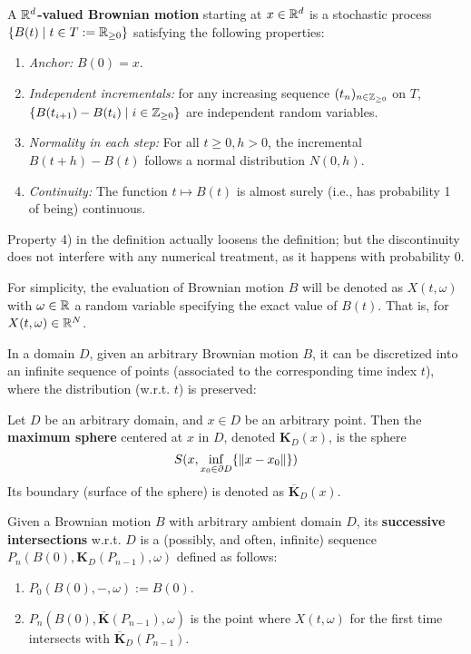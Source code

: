 \documentclass[10pt]{article}
\begin{document}
\begin{definition}
    A \textbf{$\mathbb{R}^d$-valued Brownian motion} starting at $x \in \mathbb{R}^d$ is a stochastic process $\{ B(t) \mid t \in T := \mathbb{R}_{\geq 0} \}$ satisfying the following properties:
    \begin{enumerate}[label=\arabic*)]
        \item \emph{Anchor:} $B(0) = x$.
        \item \emph{Independent incrementals:} for any increasing sequence $(t_n)_{n \in \mathbb{Z}_{\geq 0}}$ on $T$, $\{ B(t_{i+1}) - B(t_i) \mid i \in \mathbb{Z}_{\geq 0} \}$ are independent random variables.
        \item \emph{Normality in each step:} For all $t \geq 0, h > 0$, the incremental $B(t + h) - B(t)$ follows a normal distribution $N(0, h)$.
        \item \emph{Continuity:} The function $t \mapsto B(t)$ is almost surely (i.e., has probability 1 of being) continuous.
    \end{enumerate}
\end{definition}
\nogap
\begin{remark}
    Property 4) in the definition actually loosens the definition; but the discontinuity does not interfere with any numerical treatment, as it happens with probability 0.
\end{remark}
\nogap
\begin{notation}
For simplicity, the evaluation of Brownian motion $B$ will be denoted as $X(t, \omega)$ with $\omega \in \mathbb{R}$ a random variable specifying the exact value of $B(t)$. That is, for $X(t, \omega) \in \mathbb{R}^N$. 
\end{notation}

\textstart
In a domain $D$, given an arbitrary Brownian motion $B$, it can be discretized into an infinite sequence of points (associated to the corresponding time index $t$), where the distribution (w.r.t. $t$) is preserved:

\begin{definition}
    Let $D$ be an arbitrary domain, and $x \in D$ be an arbitrary point. Then the \textbf{maximum sphere} centered at $x$ in $D$, denoted $\bm{K}_D(x)$, is the sphere
    \[
        S(x, \inf_{x_0 \in \partial D} \{ \left\|x - x_0\right\| \})
    \]
    Its boundary (surface of the sphere) is denoted as $\overline{\bm{K}}_D(x)$.
\end{definition}
\nogap
\begin{definition}
    Given a Brownian motion $B$ with arbitrary ambient domain $D$, its \textbf{successive intersections} w.r.t. $D$ is a (possibly, and often, infinite) sequence $P_n(B(0), \bm{K}_D(P_{n-1}), \omega)$ defined as follows:
    \begin{enumerate}
        \item $P_0(B(0), -, \omega) := B(0)$.
        \item $P_{n}(B(0), \overline{\bm{K}}(P_{n-1}), \omega)$ is the point where $X(t, \omega)$ for the first time intersects with $\overline{\bm{K}}_D(P_{n-1})$. 
    \end{enumerate}
\end{definition}
\end{document}
